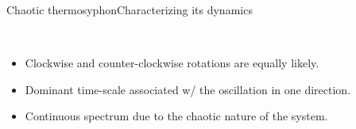 \begin{frame}[t, c]{Chaotic thermosyphon}{Characterizing its dynamics}
  \begin{minipage}{.58\textwidth}
    \begin{figure}
       \\
      \hfill
    \end{figure}
  \end{minipage}%
  \hfill
  \begin{minipage}{.38\textwidth}
    \begin{itemize}
    \item Clockwise and counter-clockwise rotations are equally likely.

      \medskip
      
    \item Dominant time-scale associated w/ the oscillation in one direction.
      
      \medskip
      
    \item Continuous spectrum due to the chaotic nature of the system.
    \end{itemize}
  \end{minipage}

  \vspace{1cm}
\end{frame}

